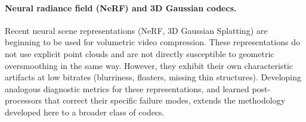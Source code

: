 \paragraph{Neural radiance field (NeRF) and 3D Gaussian codecs.}
Recent neural scene representations (NeRF, 3D Gaussian Splatting) are
beginning to be used for volumetric video compression.
These representations do not use explicit point clouds and are not directly
susceptible to geometric oversmoothing in the same way.
However, they exhibit their own characteristic artifacts at low bitrates
(blurriness, floaters, missing thin structures).
Developing analogous diagnostic metrics for these representations, and
learned post-processors that correct their specific failure modes, extends
the methodology developed here to a broader class of codecs.

